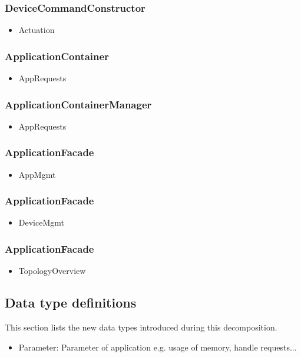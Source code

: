     \subsubsection{DeviceCommandConstructor}
        \begin{itemize}
            \item Actuation
        \end{itemize}

   \subsubsection{ApplicationContainer}
        \begin{itemize}
            \item AppRequests
        \end{itemize}

    \subsubsection{ApplicationContainerManager}
        \begin{itemize}
            \item AppRequests
        \end{itemize}

    \subsubsection{ApplicationFacade}
        \begin{itemize}
            \item AppMgmt
        \end{itemize}

    \subsubsection{ApplicationFacade}
        \begin{itemize}
            \item DeviceMgmt
        \end{itemize}

    \subsubsection{ApplicationFacade}
        \begin{itemize}
            \item TopologyOverview
        \end{itemize}


\subsection{Data type definitions}
    This section lists the new data types introduced during this decomposition.

    \begin{itemize}
        \item Parameter: Parameter of application e.g. usage of memory, handle requests...
    \end{itemize}
